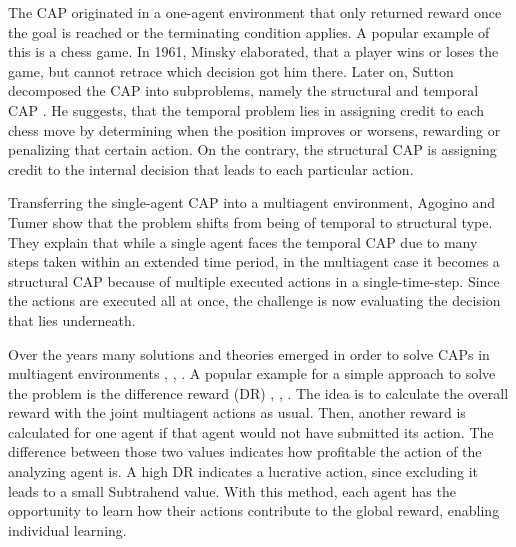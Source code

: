 The CAP originated in a one-agent environment that only returned reward once the goal is reached or the terminating condition applies. A popular example of this is a chess game. In 1961, Minsky \cite{mi61} elaborated, that a player wins or loses the game, but cannot retrace which decision got him there. 
Later on, Sutton decomposed the CAP into subproblems, namely the structural and temporal CAP \cite{su84}. He suggests, that the temporal problem lies in assigning credit to each chess move by determining when the position improves or worsens, rewarding or penalizing that certain action. On the contrary, the structural CAP is assigning credit to the internal decision that leads to each particular action.

Transferring the single-agent CAP into a multiagent environment, Agogino and Tumer \cite{agtu04} show that the problem shifts from being of temporal to structural type. They explain that while a single agent faces the temporal CAP due to many steps taken within an extended time period, in the multiagent case it becomes a structural CAP because of multiple executed actions in a single-time-step. Since the actions are executed all at once, the challenge is now evaluating the decision that lies underneath.

Over the years many solutions and theories emerged in order to solve CAPs in multiagent environments \cite{rabe09}, \cite{zhli20}, \cite{agtu04}. A popular example for a simple approach to solve the problem is the difference reward (DR) \cite{ngku18}, \cite{yltu14}, \cite{agtu04}. The idea is to calculate the overall reward with the joint multiagent actions as usual. Then, another reward is calculated for one agent if that agent would not have submitted its action. The difference between those two values indicates how profitable the action of the analyzing agent is. A high DR indicates a lucrative action, since excluding it leads to a small Subtrahend value. With this method, each agent has the opportunity to learn how their actions contribute to the global reward, enabling individual learning. 

